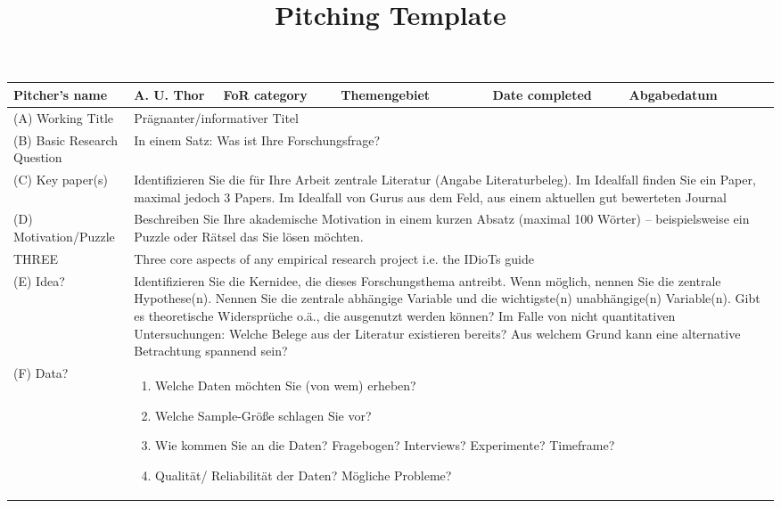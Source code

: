 \documentclass[10pt,table]{article}
\title{Pitching Template}
\date{}
\providecommand{\gercom}[1]{\glqq{}#1\grqq{}}
\providecommand{\lgc}{\cellcolor{lightgray}}
\begin{document}
\begin{center}
\begin{longtable}{p{4.5cm}p{4cm}p{2.5cm}p{4cm}p{2.5cm}p{3.5cm}}
\toprule
\lgc Pitcher's name & A. U. Thor & \lgc FoR category & Themengebiet & \lgc Date completed & Abgabedatum\\
\midrule
\lgc (A) Working Title & \multicolumn{5}{p{18cm}}{Prägnanter/informativer Titel} \\[1ex]
\lgc (B) Basic Research Question & \multicolumn{5}{p{18cm}}{In einem Satz: Was ist Ihre Forschungsfrage?} \\[1ex]
\lgc (C) Key paper(s) & \multicolumn{5}{p{18cm}}{Identifizieren Sie die für Ihre Arbeit zentrale Literatur (Angabe Literaturbeleg). Im Idealfall finden Sie ein Paper, maximal jedoch 3 Papers. Im Idealfall von \gercom{Gurus} aus dem Feld, aus einem aktuellen gut bewerteten Journal} \\[1ex]
 \lgc (D) Motivation/Puzzle & \multicolumn{5}{p{18cm}}{Beschreiben Sie Ihre akademische Motivation in einem kurzen Absatz (maximal 100 Wörter) – beispielsweise ein \gercom{Puzzle} oder \gercom{Rätsel} das Sie lösen möchten.
 } \\[1ex]
\midrule
\lgc THREE  & \multicolumn{5}{p{18cm}}{\lgc Three core aspects of any empirical research project i.e. the \gercom{IDioTs} guide} \\
\midrule
\lgc  (E) Idea?& \multicolumn{5}{p{18cm}}{Identifizieren Sie die \gercom{Kernidee}, die dieses Forschungsthema antreibt. Wenn möglich, nennen Sie die zentrale Hypothese(n). Nennen Sie die zentrale abhängige Variable und die wichtigste(n) unabhängige(n) Variable(n). Gibt es theoretische Widersprüche o.ä., die ausgenutzt werden können? Im Falle von nicht quantitativen Untersuchungen: Welche Belege aus der Literatur existieren bereits? Aus welchem Grund kann eine alternative Betrachtung spannend sein?} \\[1ex]
\lgc  (F) Data?& \multicolumn{5}{p{18cm}}{
 	\begin{enumerate}
 		\setlength\itemsep{.1ex}
 		\item Welche Daten möchten Sie (von wem) erheben? 
 		\item Welche Sample-Größe schlagen Sie vor?
 		\item Wie kommen Sie an die Daten? Fragebogen? Interviews? Experimente? Timeframe?
 		\item Qualität/ Reliabilität der Daten? Mögliche Probleme?
 	\end{enumerate}} \\[1ex]

\end{longtable}
\end{center}
\end{document}
